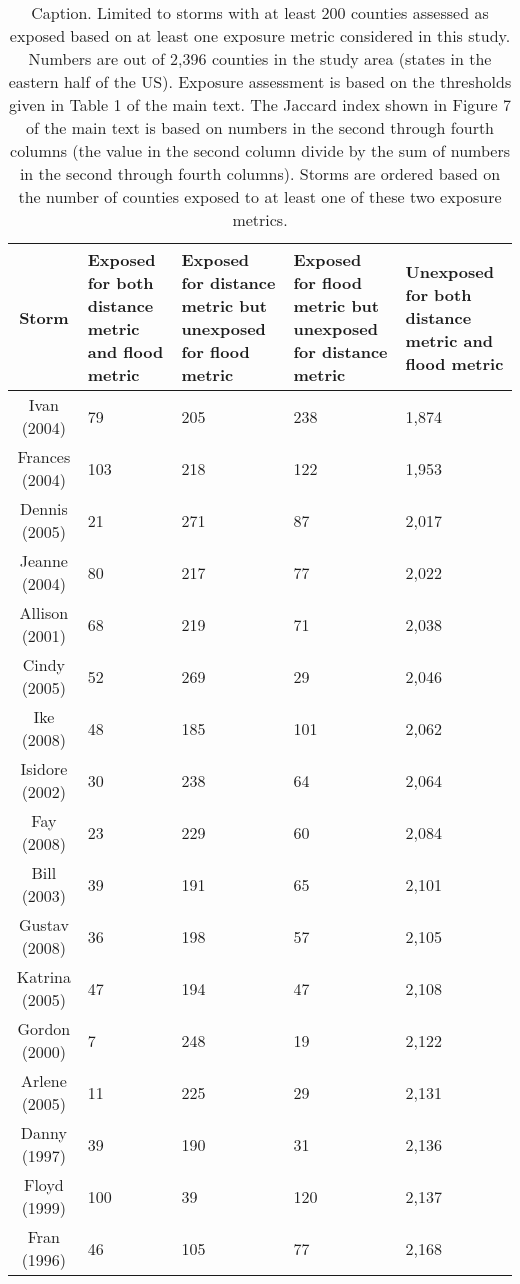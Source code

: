 \begin{table}[ht]
\centering
\caption{Caption. Limited to storms with at least 200 counties assessed as exposed based on at least one exposure metric considered in this study. Numbers are out of 2,396 counties in the study area (states in the eastern half of the US). Exposure assessment is based on the thresholds given in Table 1 of the main text. The Jaccard index shown in Figure 7 of the main text is based on numbers in the second through fourth columns (the value in the second column divide by the sum of numbers in the second through fourth columns). Storms are ordered based on the number of counties exposed to at least one of these two exposure metrics.} 
\label{tab:misclassflood}
\begin{tabular}{cP{3cm}P{3cm}P{3cm}P{3cm}}
  \toprule
Storm & Exposed for both distance metric and flood metric & Exposed for distance metric but unexposed for flood metric & Exposed for flood metric but unexposed for distance metric & Unexposed for both distance metric and flood metric \\ 
  \midrule
Ivan (2004) & 79 & 205 & 238 & 1,874 \\ 
  Frances (2004) & 103 & 218 & 122 & 1,953 \\ 
  Dennis (2005) & 21 & 271 & 87 & 2,017 \\ 
  Jeanne (2004) & 80 & 217 & 77 & 2,022 \\ 
  Allison (2001) & 68 & 219 & 71 & 2,038 \\ 
  Cindy (2005) & 52 & 269 & 29 & 2,046 \\ 
  Ike (2008) & 48 & 185 & 101 & 2,062 \\ 
  Isidore (2002) & 30 & 238 & 64 & 2,064 \\ 
  Fay (2008) & 23 & 229 & 60 & 2,084 \\ 
  Bill (2003) & 39 & 191 & 65 & 2,101 \\ 
  Gustav (2008) & 36 & 198 & 57 & 2,105 \\ 
  Katrina (2005) & 47 & 194 & 47 & 2,108 \\ 
  Gordon (2000) & 7 & 248 & 19 & 2,122 \\ 
  Arlene (2005) & 11 & 225 & 29 & 2,131 \\ 
  Danny (1997) & 39 & 190 & 31 & 2,136 \\ 
  Floyd (1999) & 100 & 39 & 120 & 2,137 \\ 
  Fran (1996) & 46 & 105 & 77 & 2,168 \\ 

\end{tabular}
\end{table}
